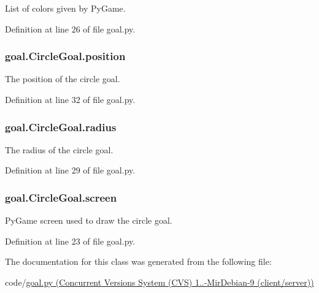 List of colors given by Py\-Game. 



Definition at line 26 of file goal.\-py.

\hypertarget{classgoal_1_1CircleGoal_a5043cf3f8c23c20b038e44888e87622f}{
\subsubsection[{position}]{\setlength{\rightskip}{0pt plus 5cm}goal.\-Circle\-Goal.\-position}}\label{classgoal_1_1CircleGoal_a5043cf3f8c23c20b038e44888e87622f}


The position of the circle goal. 



Definition at line 32 of file goal.\-py.

\hypertarget{classgoal_1_1CircleGoal_ab0dbe63cd28b07d45ceedf1bce771b07}{
\subsubsection[{radius}]{\setlength{\rightskip}{0pt plus 5cm}goal.\-Circle\-Goal.\-radius}}\label{classgoal_1_1CircleGoal_ab0dbe63cd28b07d45ceedf1bce771b07}


The radius of the circle goal. 



Definition at line 29 of file goal.\-py.

\hypertarget{classgoal_1_1CircleGoal_a0868d7060d53cd1528aa699f65db3df3}{
\subsubsection[{screen}]{\setlength{\rightskip}{0pt plus 5cm}goal.\-Circle\-Goal.\-screen}}\label{classgoal_1_1CircleGoal_a0868d7060d53cd1528aa699f65db3df3}


Py\-Game screen used to draw the circle goal. 



Definition at line 23 of file goal.\-py.



The documentation for this class was generated from the following file\-:\begin{DoxyCompactItemize}
\item 
code/\hyperlink{goal_8py}{goal.\-py (\-Concurrent Versions System (\-C\-V\-S) 1..-\/\-Mir\-Debian-\/9 (client/server))}\end{DoxyCompactItemize}
